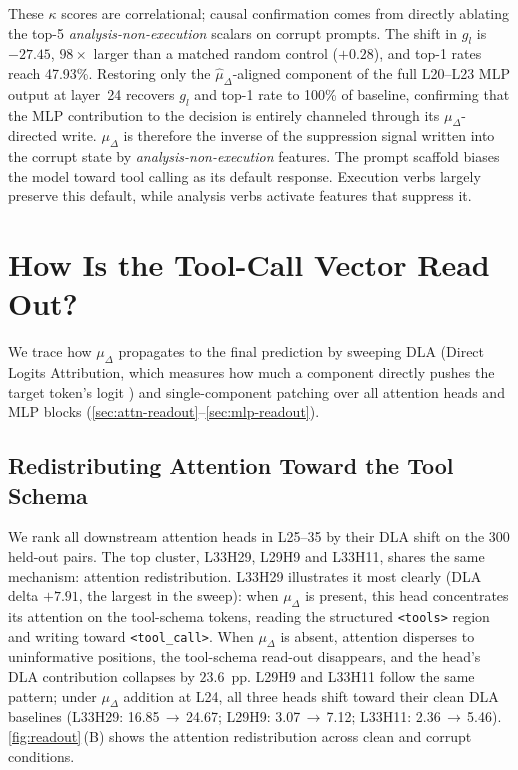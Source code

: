 \documentclass{article}
\begin{document}
These $\kappa$ scores are correlational; causal confirmation comes from
directly ablating the top-5 \emph{analysis-non-execution} scalars on
corrupt prompts. The shift in $g_l$ is $-27.45$, $98\times$
larger than a matched random control ($+0.28$), and top-1
rates reach 47.93\%. Restoring only the $\hat{\mu}_\Delta$-aligned
component of the full L20--L23 MLP output at layer~24 recovers $g_l$
and top-1 rate to 100\% of baseline, confirming that the MLP
contribution to the decision is entirely channeled through its
$\mu_\Delta$-directed write.
$\mu_\Delta$ is therefore the inverse of the suppression signal
written into the corrupt state by \emph{analysis-non-execution}
features. The prompt scaffold biases the model toward tool calling as
its default response. Execution verbs largely preserve this default, while
analysis verbs activate features that suppress it.
\vspace{-3pt}
\section{How Is the Tool-Call Vector Read Out?}
\label{sec:readout}
\vspace{-3pt}
We trace how $\mu_\Delta$ propagates to the final prediction by sweeping DLA  (Direct Logits Attribution, which measures how much a component directly pushes the target token's logit \citep{elhage2021framework})  and single-component patching over all attention heads and MLP blocks (\autoref{sec:attn-readout}--\autoref{sec:mlp-readout}).
\vspace{-3pt}
\subsection{Redistributing Attention Toward the Tool Schema}
\label{sec:attn-readout}
\vspace{-3pt}
We rank all downstream attention heads in L25--35 by their DLA shift on the 300 held-out pairs.
The top cluster, L33H29, L29H9 and L33H11, shares the same mechanism: attention redistribution.
L33H29 illustrates it most clearly (DLA delta $+7.91$, the largest in the sweep): when $\mu_\Delta$ is present, this head concentrates its attention on the tool-schema tokens, reading the structured \texttt{<tools>} region and writing toward \texttt{<tool\_call>}.
When $\mu_\Delta$ is absent, attention disperses to uninformative positions, the tool-schema read-out disappears, and the head's DLA contribution collapses by $23.6$~pp.
L29H9 and L33H11 follow the same pattern; under $\mu_\Delta$ addition at L24, all three heads shift toward their clean DLA baselines (L33H29: 16.85\,$\to$\,24.67; L29H9: 3.07\,$\to$\,7.12; L33H11: 2.36\,$\to$\,5.46).
\autoref{fig:readout}\,(B) shows the attention redistribution across clean and corrupt conditions.
\vspace{-3pt}
\end{document}
